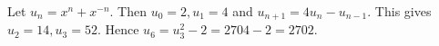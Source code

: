 Let $u_n=x^n+x^{-n}$. Then $u_0=2,u_1=4$ and $u_{n+1}=4u_n-u_{n-1}$. This gives $u_2=14,u_3=52$. Hence $u_6=u_3^2-2=2704-2=\boxed{2702}$.
